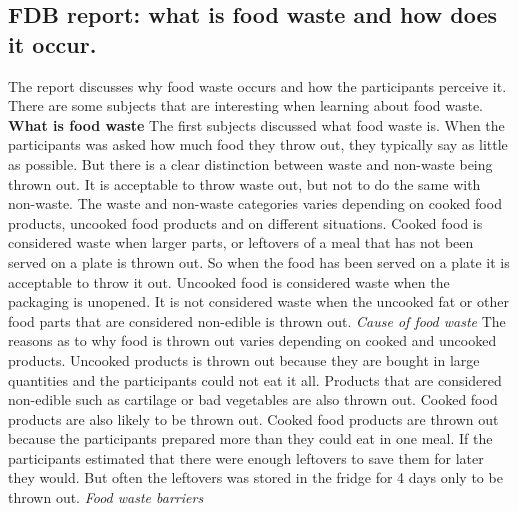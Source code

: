 \subsection{FDB report: what is food waste and how does it occur.}
The report discusses why food waste occurs and how the participants perceive it. There are some subjects that are interesting when learning about food waste. 
\textbf{What is food waste} 
The first subjects discussed what food waste is. When the participants was asked how much food they throw out, they typically say as little as possible. But there is a clear distinction between waste and non-waste being thrown out. It is acceptable to throw waste out, but not to do the same with non-waste. The waste and non-waste categories varies depending on cooked food products, uncooked food products and on different situations. Cooked food is considered waste when larger parts, or leftovers of a meal that has not been served on a plate is thrown out. So when the food has been served on a plate it is acceptable to throw it out. Uncooked food is considered waste when the packaging is unopened. It is not considered waste when the uncooked fat or other food parts that are considered non-edible is thrown out.
\textit{Cause of food waste} 
The reasons as to why food is thrown out varies depending on cooked and uncooked products. Uncooked products is thrown out because they are bought in large quantities and the participants could not eat it all. Products that are considered non-edible such as cartilage or bad vegetables are also thrown out. Cooked food products are also likely to be thrown out. Cooked food products are thrown out because the participants prepared more than they could eat in one meal. If the participants estimated that there were enough leftovers to save them for later they would. But often the leftovers was stored in the fridge for 4 days only to be thrown out.
\textit{Food waste barriers}

